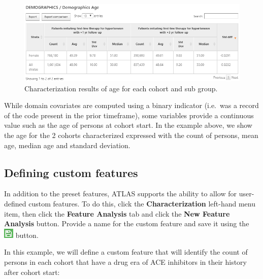\documentclass[11pt]{book}
\theoremstyle{definition}
\theoremstyle{definition}
\theoremstyle{definition}
\theoremstyle{remark}
\begin{document}
\begin{figure}

{\centering \includegraphics[width=1\linewidth]{images/Characterization/atlasCharacterizationResultsContinuous} 

}

\caption{Characterization results of age for each cohort and sub group.}\label{fig:atlasCharacterizationResultsContinuous}
\end{figure}

While domain covariates are computed using a binary indicator (i.e.~was a record of the code present in the prior timeframe), some variables provide a continuous value such as the age of persons at cohort start. In the example above, we show the age for the 2 cohorts characterized expressed with the count of persons, mean age, median age and standard deviation.

\hypertarget{defining-custom-features}{%
\subsection{Defining custom features}\label{defining-custom-features}}

In addition to the preset features, ATLAS supports the ability to allow for user-defined custom features. To do this, click the \textbf{Characterization} left-hand menu item, then click the \textbf{Feature Analysis} tab and click the \textbf{New Feature Analysis} button. Provide a name for the custom feature and save it using the \includegraphics{images/PopulationLevelEstimation/save.png} button.

In this example, we will define a custom feature that will identify the count of persons in each cohort that have a drug era of ACE inhibitors in their history after cohort start:
\end{document}

